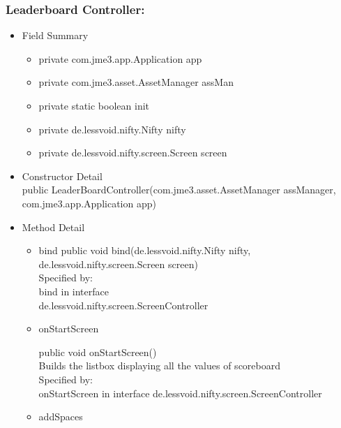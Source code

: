 \documentclass[letterpaper]{article}
\begin{document}
									\subsubsection*{Leaderboard Controller:}
								\vspace{0.1in}	
									\begin{itemize}
										\item	Field Summary
												\begin{itemize}
		\item private com.jme3.app.Application 	app 
		\item private com.jme3.asset.AssetManager 	assMan 
		\item private static boolean 	init 
		\item private de.lessvoid.nifty.Nifty 	nifty 
		\item private de.lessvoid.nifty.screen.Screen 	screen 
				\end{itemize}
										\item	Constructor Detail \\
										public LeaderBoardController(com.jme3.asset.AssetManager assManager,\\
		com.jme3.app.Application app) \\
										\item	Method Detail
												\begin{itemize}
								\item bind	
		public void bind(de.lessvoid.nifty.Nifty nifty,\\
		        de.lessvoid.nifty.screen.Screen screen) \\
		
		Specified by: \\
		    bind in interface \\ de.lessvoid.nifty.screen.ScreenController 
													\item
		    onStartScreen
		
		    public void onStartScreen() \\
		
		    Builds the listbox displaying all the values of scoreboard \\
		
		    Specified by: \\
		        onStartScreen in interface de.lessvoid.nifty.screen.ScreenController
		
		\item addSpaces
		

\end{itemize}
\end{itemize}
\end{document}

